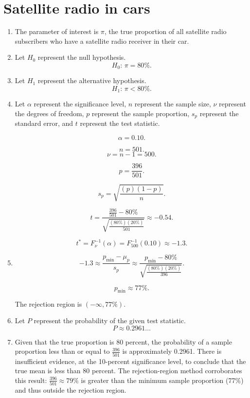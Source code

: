 \documentclass[12pt]{article}
\begin{document}
\section{Satellite radio in cars}
\begin{enumerate}
\item The parameter of interest is $\pi$, the true proportion of all satellite radio subscribers who have a satellite radio receiver in their car.
\item Let $H_0$ represent the null hypothesis.
\[H_0:\,\pi=80\%.\]
\item Let $H_1$ represent the alternative hypothesis.
\[H_1:\,\pi<80\%.\]
\item Let $\alpha$ represent the significance level, $n$ represent the sample size, $\nu$ represent the degrees of freedom, $p$ represent the sample proportion, $s_p$ represent the standard error, and $t$ represent the test statistic.

\[\alpha=0.10.\]

\[n=501.\]
\[\nu=n-1=500.\]

\[p=\frac{396}{501}.\]

\[s_p=\sqrt{\frac{(p)(1-p)}{n}}.\]

\[t=\frac{\frac{396}{501}-80\%}{\sqrt{\frac{(80\%)(20\%)}{501}}}\approx -0.54.\]

\[t^*=F^{-1}_\nu(\alpha)=F^{-1}_{500}(0.10)\approx -1.3.\]

\item \[-1.3\approx\frac{p_{\text{min}}-\mu_p}{s_p}\approx\frac{p_{\text{min}}-80\%}{\sqrt{\frac{(80\%)(20\%)}{396}}}.\]

\[p_{\text{min}}\approx 77\%.\]

The rejection region is $(-\infty,77\%)$.
\item Let $P$ represent the probability of the given test statistic.
\[P\approx 0.2961\dots\]

\item Given that the true proportion is 80 percent, the probability of a sample proportion less than or equal to $\frac{396}{501}$ is approximately 0.2961. There is insufficient evidence, at the 10-percent significance level, to conclude that the true mean is less than 80 percent. The rejection-region method corroborates this result: $\frac{396}{501}\approx79\%$ is greater than the minimum sample proportion (77\%) and thus outside the rejection region.
\end{enumerate}
\end{document}
